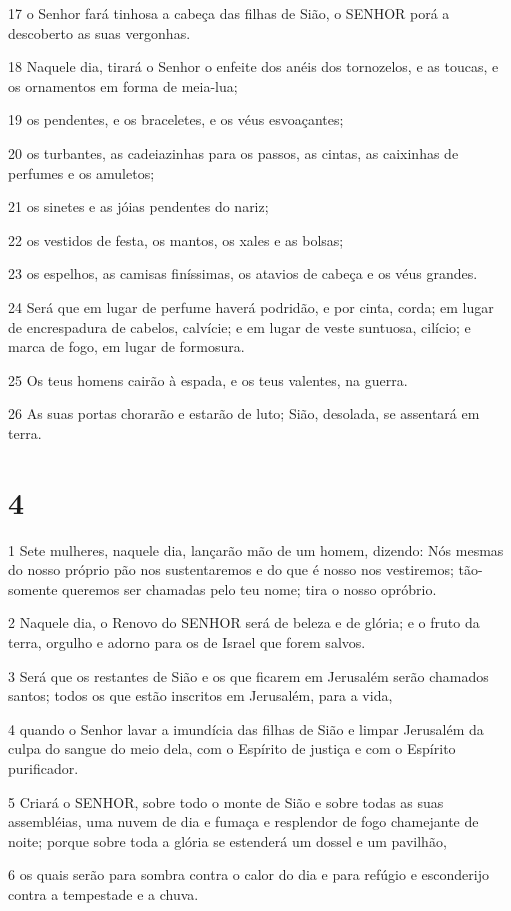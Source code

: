 \par 17 o Senhor fará tinhosa a cabeça das filhas de Sião, o SENHOR porá a descoberto as suas vergonhas.
\par 18 Naquele dia, tirará o Senhor o enfeite dos anéis dos tornozelos, e as toucas, e os ornamentos em forma de meia-lua;
\par 19 os pendentes, e os braceletes, e os véus esvoaçantes;
\par 20 os turbantes, as cadeiazinhas para os passos, as cintas, as caixinhas de perfumes e os amuletos;
\par 21 os sinetes e as jóias pendentes do nariz;
\par 22 os vestidos de festa, os mantos, os xales e as bolsas;
\par 23 os espelhos, as camisas finíssimas, os atavios de cabeça e os véus grandes.
\par 24 Será que em lugar de perfume haverá podridão, e por cinta, corda; em lugar de encrespadura de cabelos, calvície; e em lugar de veste suntuosa, cilício; e marca de fogo, em lugar de formosura.
\par 25 Os teus homens cairão à espada, e os teus valentes, na guerra.
\par 26 As suas portas chorarão e estarão de luto; Sião, desolada, se assentará em terra.

\chapter{4}

\par 1 Sete mulheres, naquele dia, lançarão mão de um homem, dizendo: Nós mesmas do nosso próprio pão nos sustentaremos e do que é nosso nos vestiremos; tão-somente queremos ser chamadas pelo teu nome; tira o nosso opróbrio.
\par 2 Naquele dia, o Renovo do SENHOR será de beleza e de glória; e o fruto da terra, orgulho e adorno para os de Israel que forem salvos.
\par 3 Será que os restantes de Sião e os que ficarem em Jerusalém serão chamados santos; todos os que estão inscritos em Jerusalém, para a vida,
\par 4 quando o Senhor lavar a imundícia das filhas de Sião e limpar Jerusalém da culpa do sangue do meio dela, com o Espírito de justiça e com o Espírito purificador.
\par 5 Criará o SENHOR, sobre todo o monte de Sião e sobre todas as suas assembléias, uma nuvem de dia e fumaça e resplendor de fogo chamejante de noite; porque sobre toda a glória se estenderá um dossel e um pavilhão,
\par 6 os quais serão para sombra contra o calor do dia e para refúgio e esconderijo contra a tempestade e a chuva.

